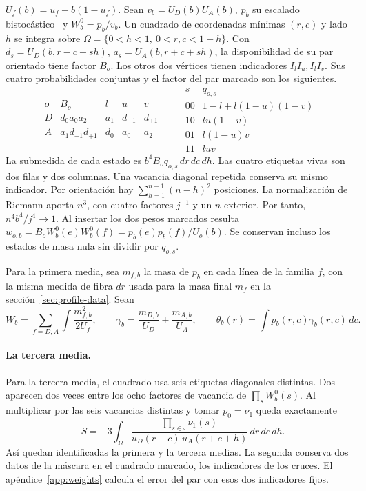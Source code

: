 \(U_f(b)=u_f+b(1-u_f)\). Sean \(v_b=U_D(b)U_A(b)\), \(p_b\) su escalado
bistocástico~\cite{sk} y
\(W_b^0=p_b/v_b\). Un cuadrado de coordenadas mínimas \((r,c)\) y lado \(h\) se integra sobre
\(\Omega=\{0<h<1,\ 0<r,c<1-h\}\).
Con \(d_s=U_D(b,r-c+sh)\), \(a_s=U_A(b,r+c+sh)\), la disponibilidad de su par orientado
tiene factor \(B_o\). Los otros dos vértices tienen indicadores \(I_l I_u,I_l I_v\).
Sus cuatro probabilidades conjuntas y el factor del par marcado son los siguientes.
\[
\begin{array}{c|cccc}
o&B_o&l&u&v\\\hline
 D&d_0a_0a_2&a_1&d_{-1}&d_{+1}\\
 A&a_1d_{-1}d_{+1}&d_0&a_0&a_2
\end{array}
\qquad
\begin{array}{c|c}
s&q_{o,s}\\\hline
00&1-l+l(1-u)(1-v)\\
10&lu(1-v)\\
01&l(1-u)v\\
11&luv
\end{array}
\]
La submedida de cada estado es \(b^4 B_o q_{o,s}\,dr\,dc\,dh\). Las cuatro etiquetas vivas son
dos filas y dos columnas. Una vacancia diagonal repetida conserva su mismo indicador.
Por orientación hay \(\sum_{h=1}^{n-1}(n-h)^2\) posiciones.
La normalización de Riemann aporta \(n^3\), con cuatro factores \(j^{-1}\) y un \(n\) exterior.
Por tanto,
\(n^4 b^4/j^4\to1\). Al insertar los dos pesos marcados resulta
\(w_{o,b}=B_oW_b^0(e)W_b^0(f)=p_b(e)p_b(f)/U_o(b)\).
Se conservan incluso los estados de masa nula sin dividir por \(q_{o,s}\).

Para la primera media, sea \(m_{f,b}\) la masa de \(p_b\) en cada línea de la familia \(f\),
con la misma medida de fibra \(dr\) usada para la masa final \(m_f\) en la
sección~\ref{sec:profile-data}. Sean
\[
 W_b=\sum_{f=D,A}\int\frac{m_{f,b}^2}{2U_f},\qquad
 \gamma_b=\frac{m_{D,b}}{U_D}+\frac{m_{A,b}}{U_A},\qquad
 \theta_b(r)=\int p_b(r,c)\gamma_b(r,c)\,dc .
\]


\paragraph{La tercera media.}
Para la tercera media, el cuadrado usa seis etiquetas diagonales distintas. Dos aparecen dos
veces entre los ocho factores de vacancia de \(\prod_s W_b^0(s)\). Al multiplicar por las seis
vacancias distintas y tomar \(p_0=\nu_1\) queda exactamente
\begin{equation}\label{eq:S-def}
 -S=-3\int_\Omega
       \frac{\prod_{s\in\square}\nu_1(s)}
            {u_D(r-c)\,u_A(r+c+h)}\,dr\,dc\,dh .
\end{equation}
Así quedan identificadas la primera y la tercera medias. La segunda conserva dos datos de la
máscara en el cuadrado marcado, los indicadores de los cruces. El apéndice~\ref{app:weights}
calcula el error del par con esos dos indicadores fijos.
